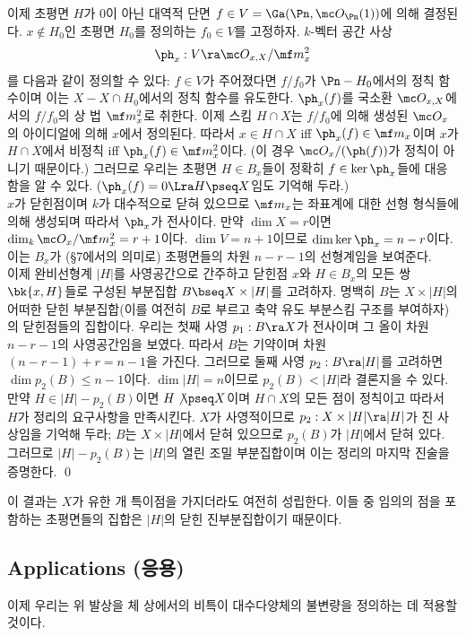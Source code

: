 \begin{theorem}
	이제 초평면 $H$가 0이 아닌 대역적 단면 $f\in V=\Ga(\Pn,\mc O_{\Pn}(1))$에 의해 결정된다.
	$x\notin H_0$인 초평면 $H_0$를 정의하는 $f_0\in V$를 고정하자. $k$-벡터 공간 사상
	$$\ph_x:V\ra\mc O_{x,X}/\mf m_x^2$$
	를 다음과 같이 정의할 수 있다:
	$f\in V$가 주어졌다면 $f/f_0$가 $\Pn-H_0$에서의 정칙 함수이며 이는 $X-X\cap H_0$에서의 정칙 함수를 유도한다.
	$\ph_x(f)$를 국소환 $\mc O_{x,X}$에서의 $f/f_0$의 상 법 $\mf m_x^2$로 취한다.
	이제 스킴 $H\cap X$는 $f/f_0$에 의해 생성된 $\mc O_x$의 아이디얼에 의해 $x$에서 정의된다.
	따라서 $x\in H\cap X$ iff $\ph_x(f)\in\mf m_x$이며 $x$가 $H\cap X$에서 비정칙 iff $\ph_x(f)\in\mf m_x^2$이다.
	(이 경우 $\mc O_x/(\ph(f))$가 정칙이 아니기 때문이다.)
	그러므로 우리는 초평면 $H\in B_x$들이 정확히 $f\in\ker\ph_x$들에 대응함을 알 수 있다.
	($\ph_x(f)=0\Lra H\pseq X$임도 기억해 두라.)\\
	$x$가 닫힌점이며 $k$가 대수적으로 닫혀 있으므로 $\mf m_x$는 좌표계에 대한 선형 형식들에 의해 생성되며 따라서 $\ph_x$가 전사이다.
	만약 $\dim X=r$이면 $\dim_k\mc O_x/\mf m_x^2=r+1$이다. $\dim V=n+1$이므로 $\dim\ker\ph_x=n-r$이다.
	이는 $B_x$가 (\S 7에서의 의미로) 초평면들의 차원 $n-r-1$의 선형계임을 보여준다.\\
	이제 완비선형계 $|H|$를 사영공간으로 간주하고 닫힌점 $x$와 $H\in B_x$의 모든 쌍 $\bk{x,H}$들로 구성된
	부분집합 $B\bseq X\times|H|$를 고려하자.
	명백히 $B$는 $X\times|H|$의 어떠한 닫힌 부분집합(이를 여전히 $B$로 부르고 축약 유도 부분스킴 구조를 부여하자)의 닫힌점들의 집합이다.
	우리는 첫째 사영 $p_1:B\ra X$가 전사이며 그 올이 차원 $n-r-1$의 사영공간임을 보였다.
	따라서 $B$는 기약이며 차원 $(n-r-1)+r=n-1$을 가진다.
	그러므로 둘째 사영 $p_2:B\ra|H|$를 고려하면 $\dim p_2(B)\le n-1$이다.
	$\dim|H|=n$이므로 $p_2(B)<|H|$라 결론지을 수 있다.
	만약 $H\in|H|-p_2(B)$이면 $H\not\pseq X$이며 $H\cap X$의 모든 점이 정칙이고 따라서 $H$가 정리의 요구사항을 만족시킨다.
	$X$가 사영적이므로 $p_2:X\times|H|\ra|H|$가 진 사상임을 기억해 두라;
	$B$는 $X\times|H|$에서 닫혀 있으므로 $p_2(B)$가 $|H|$에서 닫혀 있다.
	그러므로 $|H|-p_2(B)$는 $|H|$의 열린 조밀 부분집합이며 이는 정리의 마지막 진술을 증명한다.
	\qed
	\end{theorem}
	
	
	\begin{remark}
	이 결과는 $X$가 유한 개 특이점을 가지더라도 여전히 성립한다.
	이들 중 임의의 점을 포함하는 초평면들의 집합은 $|H|$의 닫힌 진부분집합이기 때문이다.
	\end{remark}
	
	
	\subsection*{Applications (응용)}
	이제 우리는 위 발상을 체 상에서의 비특이 대수다양체의 불변량을 정의하는 데 적용할 것이다.
	
